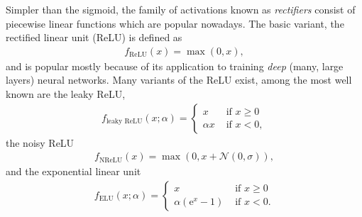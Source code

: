 \documentclass[a4paper, twocolumn]{article}
\begin{document}
Simpler than the sigmoid, the family of activations known as \textit{rectifiers} consist of piecewise linear functions which are popular nowadays. The basic variant, the rectified linear unit (ReLU) is defined as 
\begin{align}
f_\text{ReLU}(x)=\max(0,x),
\end{align}
and is popular mostly because of its application to training \textit{deep} (many, large layers) neural networks\autocite{glorot2011deep}. Many variants of the ReLU exist, among the most well known are the leaky ReLU,
\begin{align}
f_\text{leaky ReLU}(x;\alpha)=
\begin{cases}
x & \text{ if }x\ge0 \\
\alpha x & \text{ if } x<0,
\end{cases}
\end{align}
the noisy ReLU
\begin{align}
f_\text{NReLU}(x) = \max(0,x+\mathcal{N}(0,\sigma)),
\end{align}
and the exponential linear unit
\begin{align}
f_\text{ELU}(x;\alpha) = 
\begin{cases}
x & \text{ if } x\ge 0 \\
\alpha(\mathrm{e}^x-1) & \text{ if } x< 0.
\end{cases}
\end{align}
\end{document}
